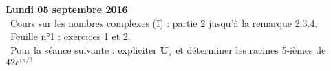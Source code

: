 \documentclass[12pt,a4paper]{article}
\begin{document}
% 
%  
%  
% 
% 

\noindent\textbf{Lundi 05 septembre 2016}\\
\bu\ Cours sur les nombres complexes (I) : partie 2 jusqu'à la remarque 2.3.4.\\
\bu\ Feuille n°1 : exercices 1 et 2.\\
\bu\ Pour la séance suivante : expliciter $\mathbf{U}_7$ et déterminer les racines 5-ièmes de $42 e^{i\pi/3}$\vspace{.4cm}\\
\end{document}
